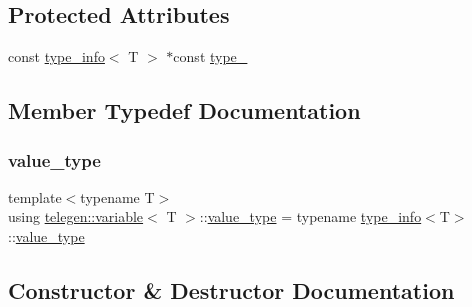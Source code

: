 \subsection*{Protected Attributes}
\begin{DoxyCompactItemize}
\item 
const \hyperlink{structtelegen_1_1type__info}{type\+\_\+info}$<$ T $>$ $\ast$const \hyperlink{classtelegen_1_1variable_ac67a18e28f7fde8cf9e86e97d4cc3ece}{type\+\_\+}
\end{DoxyCompactItemize}


\subsection{Member Typedef Documentation}
\mbox{\label{classtelegen_1_1variable_a5c393a9657a0a4d9287c1269d1eda654}} 
\subsubsection{\texorpdfstring{value\+\_\+type}{value\_type}}
{\footnotesize\ttfamily template$<$typename T$>$ \\
using \hyperlink{classtelegen_1_1variable}{telegen\+::variable}$<$ T $>$\+::\hyperlink{classtelegen_1_1variable_a5c393a9657a0a4d9287c1269d1eda654}{value\+\_\+type} =  typename \hyperlink{structtelegen_1_1type__info}{type\+\_\+info}$<$T$>$\+::\hyperlink{classtelegen_1_1variable_a5c393a9657a0a4d9287c1269d1eda654}{value\+\_\+type}}



\subsection{Constructor \& Destructor Documentation}
\mbox{\label{classtelegen_1_1variable_ab4f2caa5cd1b6b9956d86ed567a4ec05}} 
